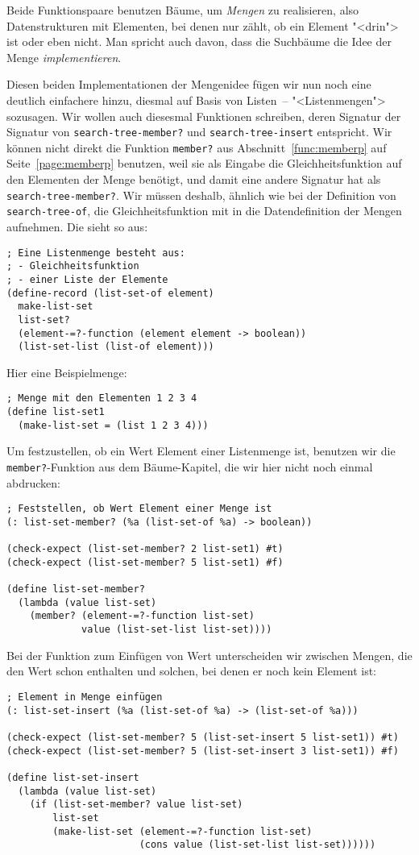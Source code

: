 Beide Funktionspaare benutzen Bäume, um \textit{Mengen}
zu realisieren, also Datenstrukturen mit Elementen, bei denen nur
zählt, ob ein Element "<drin"> ist oder eben nicht.  Man spricht auch
davon, dass die Suchbäume die Idee der Menge
\textit{implementieren}.

Diesen beiden Implementationen der Mengenidee fügen wir nun noch eine
deutlich einfachere hinzu, diesmal auf Basis von Listen~--
"<Listenmengen"> sozusagen. Wir wollen auch
diesesmal Funktionen schreiben, deren Signatur der Signatur von
\lstinline{search-tree-member?} und \lstinline{search-tree-insert}
entspricht.  Wir können nicht direkt die Funktion \lstinline{member?}
aus Abschnitt~\ref{func:memberp} auf Seite~\ref{page:memberp}
benutzen, weil sie als Eingabe die Gleichheitsfunktion auf den
Elementen der Menge benötigt, und damit eine andere Signatur hat als
\lstinline{search-tree-member?}.  Wir müssen deshalb, ähnlich wie bei
der Definition von \lstinline{search-tree-of}, die Gleichheitsfunktion
mit in die Datendefinition der Mengen aufnehmen.  Die sieht so aus:
%
\begin{lstlisting}
; Eine Listenmenge besteht aus:
; - Gleichheitsfunktion
; - einer Liste der Elemente
(define-record (list-set-of element)
  make-list-set
  list-set?
  (element-=?-function (element element -> boolean))
  (list-set-list (list-of element)))
\end{lstlisting}
%
Hier eine Beispielmenge:
%
\begin{lstlisting}
; Menge mit den Elementen 1 2 3 4
(define list-set1
  (make-list-set = (list 1 2 3 4)))
\end{lstlisting}
%
Um festzustellen, ob ein Wert Element einer Listenmenge ist, benutzen
wir die \lstinline{member?}-Funktion aus dem Bäume-Kapitel, die wir
hier nicht noch einmal abdrucken:
%
\begin{lstlisting}
; Feststellen, ob Wert Element einer Menge ist
(: list-set-member? (%a (list-set-of %a) -> boolean))

(check-expect (list-set-member? 2 list-set1) #t)
(check-expect (list-set-member? 5 list-set1) #f)

(define list-set-member?
  (lambda (value list-set)
    (member? (element-=?-function list-set)
             value (list-set-list list-set))))
\end{lstlisting}
%
Bei der Funktion zum Einfügen von Wert unterscheiden wir zwischen
Mengen, die den Wert schon enthalten und solchen, bei denen er noch
kein Element ist:
%
\begin{lstlisting}
; Element in Menge einfügen
(: list-set-insert (%a (list-set-of %a) -> (list-set-of %a)))

(check-expect (list-set-member? 5 (list-set-insert 5 list-set1)) #t)
(check-expect (list-set-member? 5 (list-set-insert 3 list-set1)) #f)

(define list-set-insert
  (lambda (value list-set)
    (if (list-set-member? value list-set)
        list-set
        (make-list-set (element-=?-function list-set)
                       (cons value (list-set-list list-set))))))
\end{lstlisting}
